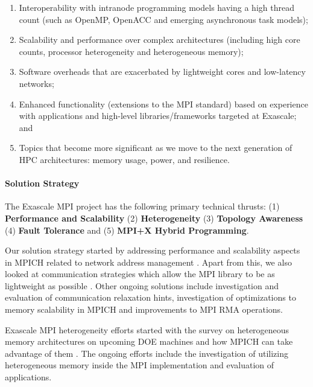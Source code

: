 \begin{enumerate}

\item Interoperability with intranode programming models having a high
  thread count \cite{Hybrid1, Hybrid2, FT2} (such as OpenMP,
  OpenACC and emerging asynchronous task models);

\item Scalability and performance over complex architectures
  \cite{Perf1, Perf2, FT2, Perf4} (including high core counts,
  processor heterogeneity and heterogeneous memory);

\item Software overheads that are exacerbated by lightweight cores and
  low-latency networks;

\item Enhanced functionality (extensions to the MPI standard) based on
  experience with applications and high-level libraries/frameworks
  targeted at Exascale; and

\item Topics that become more significant as we move to the next
  generation of HPC architectures: memory usage, power, and
  resilience.

\end{enumerate}


\paragraph{Solution Strategy}

The Exascale MPI project has the following primary technical thrusts:
(1) \textbf{Performance and Scalability} (2) \textbf{Heterogeneity}
(3) \textbf{Topology Awareness} (4) \textbf{Fault Tolerance} and (5)
\textbf{MPI+X Hybrid Programming}.

Our solution strategy started by addressing performance and
scalability aspects in MPICH related to network address management
\cite{memscal}.  Apart from this, we also looked at communication
strategies which allow the MPI library to be as lightweight as
possible \cite{ch41, ch42}.  Other ongoing solutions include
investigation and evaluation of communication relaxation hints,
investigation of optimizations to memory scalability in MPICH and
improvements to MPI RMA operations.

Exascale MPI heterogeneity efforts \cite{Hetero1, Hetero2, Hetero3}
started with the survey on heterogeneous memory architectures on
upcoming DOE machines and how MPICH can take advantage of them
\cite{hexe}.  The ongoing efforts include the investigation of
utilizing heterogeneous memory inside the MPI implementation and
evaluation of applications.

